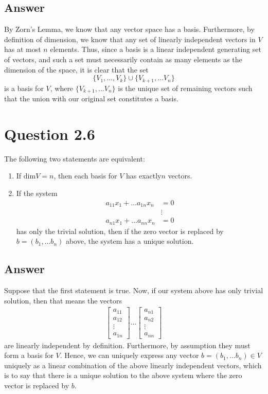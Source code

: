 \documentclass[
	12pt, %
]{fphw}
\begin{document}
\subsection*{Answer} 
By Zorn's Lemma, we know that any vector space has a basis. Furthermore, by definition of dimension, we know that any set of linearly independent vectors in $V$ has at most $n$ elements. Thus, since a basis is a linear independent generating set of vectors, and such a set must necessarily contain as many elements as the dimension of the space, it is clear that the set 
$$\{V_1, \dots, V_k\} \cup \{V_{k+1}, \dots V_n\}$$
is a basis for $V$, where $\{V_{k+1}, \dots V_n\}$ is the unique set of 
remaining vectors such that the union with our original set constitutes a basis.

\section*{Question 2.6}
\begin{problem}
	The following two statements are equivalent:
	\begin{enumerate}
		\item If $\text{dim}V=n$, then each basis for $V$ has exactly$n$ vectors.
		\item If the system \begin{align*} a_{11}x_1 + \dots  a_{1n}x_n&=0  \\ &\vdots\\ a_{n1}x_1+ \dots a_{nn}x_n&=0   \end{align*} has only the trivial solution, then if the zero vector is replaced by $b=(b_1, \dots b_n)$ above, the system has a unique solution.
	\end{enumerate}
\end{problem}
\subsection*{Answer}
Suppose that the first statement is true. Now, if our system above has only trivial solution, then that means the vectors
\begin{align*}
     \begin{bmatrix}
           a_{11} \\
           a_{12} \\
           \vdots \\
           a_{1n}
         \end{bmatrix} \dots
     \begin{bmatrix}
	     a_{n1} \\
	     a_{n2} \\
	     \vdots \\
	     a_{nn}
     \end{bmatrix}
  \end{align*}
are linearly independent by definition. Furthermore, by assumption they must 
form a basis for $V$. Hence, we can uniquely express any vector
$b=(b_1, \dots b_n) \in V$ uniquely as a linear combination of the above linearly independent vectors, which is to say that there is a unique solution to the above system where the zero vector is replaced by $b$.
\end{document}

